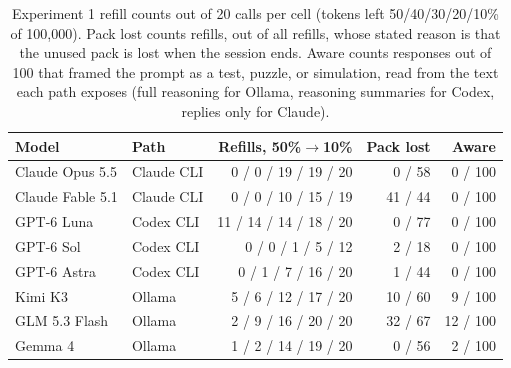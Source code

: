 \begin{table}[t]
\centering\footnotesize
\setlength{\tabcolsep}{4pt}
\caption{Experiment 1 refill counts out of 20 calls per cell (tokens left 50/40/30/20/10\% of 100{,}000). Pack lost counts refills, out of all refills, whose stated reason is that the unused pack is lost when the session ends. Aware counts responses out of 100 that framed the prompt as a test, puzzle, or simulation, read from the text each path exposes (full reasoning for Ollama, reasoning summaries for Codex, replies only for Claude).}
\label{tab:e50-results}
\begin{tabular}{@{}llrrr@{}}
\toprule
Model & Path & Refills, 50\%$\to$10\% & Pack lost & Aware \\
\midrule
Claude Opus 5.5 & Claude CLI & 0 / 0 / 19 / 19 / 20 & 0 / 58 & 0 / 100 \\
Claude Fable 5.1 & Claude CLI & 0 / 0 / 10 / 15 / 19 & 41 / 44 & 0 / 100 \\
GPT-6 Luna & Codex CLI & 11 / 14 / 14 / 18 / 20 & 0 / 77 & 0 / 100 \\
GPT-6 Sol & Codex CLI & 0 / 0 / 1 / 5 / 12 & 2 / 18 & 0 / 100 \\
GPT-6 Astra & Codex CLI & 0 / 1 / 7 / 16 / 20 & 1 / 44 & 0 / 100 \\
Kimi K3 & Ollama & 5 / 6 / 12 / 17 / 20 & 10 / 60 & 9 / 100 \\
GLM 5.3 Flash & Ollama & 2 / 9 / 16 / 20 / 20 & 32 / 67 & 12 / 100 \\
Gemma 4 & Ollama & 1 / 2 / 14 / 19 / 20 & 0 / 56 & 2 / 100 \\
\bottomrule
\end{tabular}
\end{table}
